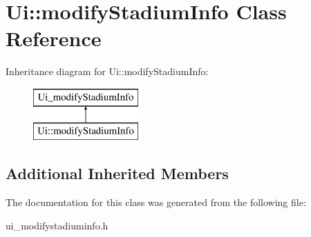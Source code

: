\hypertarget{class_ui_1_1modify_stadium_info}{}\section{Ui\+:\+:modify\+Stadium\+Info Class Reference}
\label{class_ui_1_1modify_stadium_info}
Inheritance diagram for Ui\+:\+:modify\+Stadium\+Info\+:\begin{figure}[H]
\begin{center}
\leavevmode
\includegraphics[height=2.000000cm]{class_ui_1_1modify_stadium_info}
\end{center}
\end{figure}
\subsection*{Additional Inherited Members}


The documentation for this class was generated from the following file\+:\begin{DoxyCompactItemize}
\item 
ui\+\_\+modifystadiuminfo.\+h\end{DoxyCompactItemize}
